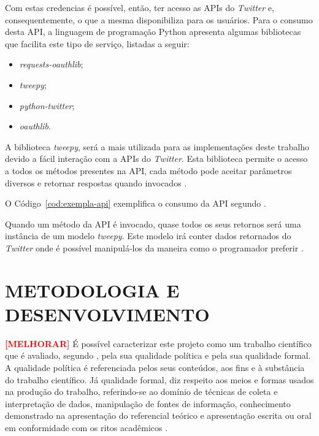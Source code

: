 Com estas credencias é possível, então, ter acesso as APIs do \textit{Twitter} e, consequentemente, o que a mesma disponibiliza para os usuários. Para o consumo desta API, a linguagem de programação Python apresenta algumas bibliotecas que facilita este tipo de serviço, listadas a seguir:

\begin{itemize}
	\item \textit{requests-oauthlib};
	\item \textit{tweepy};
	\item \textit{python-twitter};
	\item \textit{oauthlib}.
\end{itemize}

A biblioteca \textit{tweepy}, será a mais utilizada para as implementações deste trabalho devido a fácil interação com a APIs do \textit{Twitter}. Esta biblioteca permite o acesso a todos os métodos presentes na API, cada método pode aceitar parâmetros diversos e retornar respostas quando invocados \cite{tweepy}.

O Código~\ref{cod:exempla-api} exemplifica o consumo da API segundo .



Quando um método da API é invocado, quase todos os seus retornos será uma instância de um modelo \textit{tweepy}. Este modelo irá conter dados retornados do \textit{Twitter} onde é possível manipulá-los da maneira como o programador preferir \cite{tweepy}.


\section{METODOLOGIA E DESENVOLVIMENTO}\label{sec: metodologia} \textbf{\textcolor{red}{[MELHORAR]}}
É possível caracterizar este projeto como um trabalho científico que é avaliado, segundo , pela sua qualidade política e pela sua qualidade formal. A qualidade política é referenciada pelos seus conteúdos, aos fins e à substância do trabalho científico. Já qualidade formal, diz respeito aos meios e formas usados na produção do trabalho, referindo-se ao domínio de técnicas de coleta e interpretação de dados, manipulação de fontes de informação, conhecimento demonstrado na apresentação do referencial teórico e apresentação escrita ou oral em conformidade com os ritos acadêmicos \cite{metodologia}.

